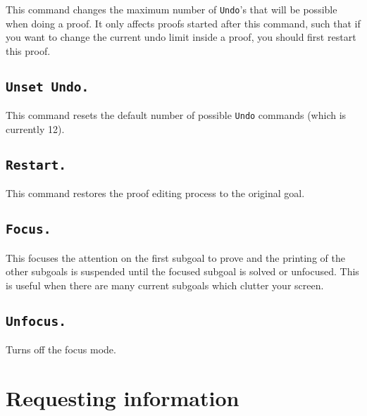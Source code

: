 This command changes the maximum number of {\tt Undo}'s that will be
possible when doing a proof. It only affects proofs started after
this command, such that if you want to change the current undo limit
inside a proof, you should first restart this proof.

\subsection[\tt Unset Undo.]{\tt Unset Undo.}

This command resets the default number of possible {\tt Undo} commands
(which is currently 12).

\subsection[\tt Restart.]{\tt Restart.}
This command restores the proof editing process to the original goal.

\begin{ErrMsgs}
\item {}
\end{ErrMsgs}

\subsection[\tt Focus.]{\tt Focus.}
This focuses the attention on the first subgoal to prove and the printing
of the other subgoals is suspended until the focused subgoal is
solved or unfocused. This is useful when there are many current
subgoals which clutter your screen.


\subsection[\tt Unfocus.]{\tt Unfocus.}
Turns off the focus mode.


\section{Requesting information}


